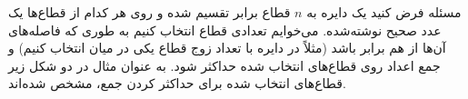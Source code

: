 ‌مسئله
فرض کنید یک دایره به $n$ قطاع برابر تقسیم شده و روی هر کدام از قطاع‌ها یک عدد صحیح نوشته‌شده.
می‌خوایم تعدادی قطاع انتخاب کنیم به طوری که فاصله‌های آن‌ها از هم برابر باشد (مثلاً در دایره با تعداد زوج قطاع یکی در میان انتخاب کنیم) و جمع اعداد روی قطاع‌های انتخاب شده حداکثر شود. به عنوان مثال در دو شکل زیر قطاع‌های انتخاب شده برای حداکثر کردن جمع، مشخص شده‌اند.

 
 
 \begin{center}



\begin{tikzpicture}[x=0.75pt,y=0.75pt,yscale=-1,xscale=1]
	

\end{tikzpicture}
\end{center}
